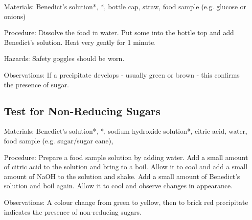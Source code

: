 \begin{multicols}{2}
\begin{description*}
\item[Materials:]{Benedict's solution*, *, bottle cap, straw, food sample (e.g. glucose or onions)}
\item[Procedure:]{Dissolve the food in water. Put
some into the bottle top and add
Benedict's solution.
Heat very gently for 1 minute.}
\item[Hazards:]{Safety goggles should be worn. }
\item[Observations:]{If
a precipitate develops - usually
green or brown - this confirms
the presence of sugar.}
\end{description*}

\subsection{Test for Non-Reducing Sugars}


\begin{description*}
\item[Materials:]{Benedict's solution*, *, sodium hydroxide solution*, citric acid, water, food sample (e.g. sugar/sugar cane), }
\item[Procedure:]{Prepare a food sample solution by adding water. Add a small amount of citric acid to the solution and bring to a boil. Allow it to cool and add a small amount of NaOH to the solution and shake. Add a small amount of Benedict's solution and boil again. Allow it to cool and observe changes in appearance.}
\item[Observations:]{A colour change from green to yellow, then to brick red precipitate indicates the presence of non-reducing sugars.}
\end{description*}


\end{multicols}
